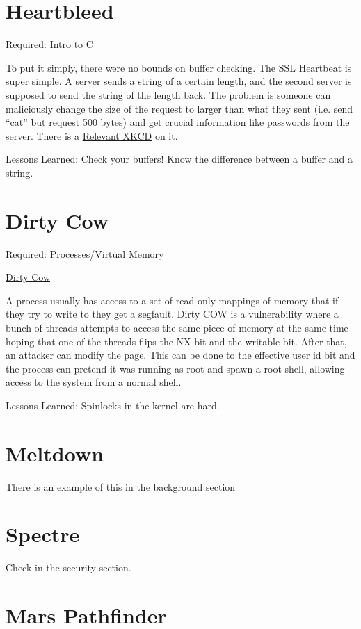 \section{Heartbleed}

Required: Intro to C

To put it simply, there were no bounds on buffer checking.
The SSL Heartbeat is super simple.
A server sends a string of a certain length, and the second server is supposed to send the string of the length back.
The problem is someone can maliciously change the size of the request to larger than what they sent (i.e. send ``cat'' but request 500 bytes) and get crucial information like passwords from the server.
There is a \href{https://xkcd.com/1354/}{Relevant XKCD} on it.

Lessons Learned: Check your buffers!
Know the difference between a buffer and a string.

\section{Dirty Cow}

Required: Processes/Virtual Memory

\href{https://en.wikipedia.org/wiki/Dirty_COW}{Dirty Cow}

A process usually has access to a set of read-only mappings of memory that if they try to write to they get a segfault.
Dirty COW is a vulnerability where a bunch of threads attempts to access the same piece of memory at the same time hoping that one of the threads flips the NX bit and the writable bit.
After that, an attacker can modify the page.
This can be done to the effective user id bit and the process can pretend it was running as root and spawn a root shell, allowing access to the system from a normal shell.

Lessons Learned: Spinlocks in the kernel are hard.

\section{Meltdown}

There is an example of this in the background section

\section{Spectre}

Check in the security section.

\section{Mars Pathfinder}

